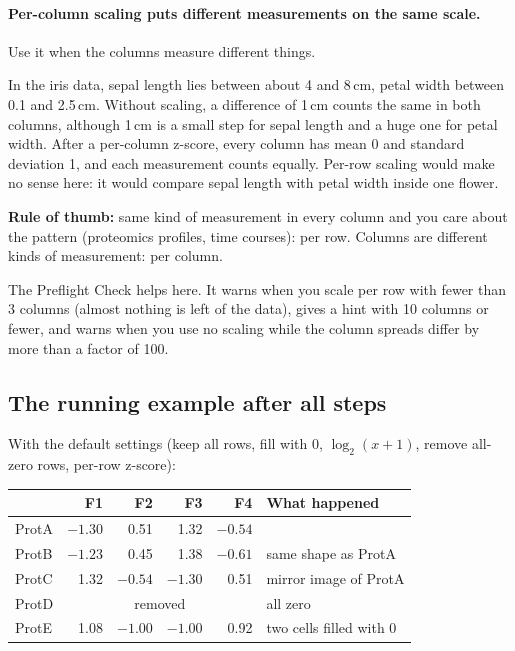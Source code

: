 \documentclass[11pt,a4paper]{article}
\begin{document}
\paragraph{Per-column scaling puts different measurements on the same scale.}
Use it when the columns measure different things.

\begin{example}
In the iris data, sepal length lies between about 4 and 8\,cm, petal width between 0.1 and 2.5\,cm. Without scaling,
a difference of 1\,cm counts the same in both columns, although 1\,cm is a small step for sepal length and a huge
one for petal width. After a per-column z-score, every column has mean 0 and standard deviation 1, and each
measurement counts equally. Per-row scaling would make no sense here: it would compare sepal length with petal
width inside one flower.
\end{example}

\textbf{Rule of thumb:} same kind of measurement in every column and you care about the pattern (proteomics
profiles, time courses): per row. Columns are different kinds of measurement: per column.

The Preflight Check helps here. It warns when you scale per row with fewer than 3 columns (almost nothing is left of
the data), gives a hint with 10 columns or fewer, and warns when you use no scaling while the column spreads differ
by more than a factor of 100.

\subsection{The running example after all steps}

With the default settings (keep all rows, fill with 0, $\log_2(x+1)$, remove all-zero rows, per-row z-score):

\begin{center}
\begin{tabular}{l rrrr l}
\toprule
& F1 & F2 & F3 & F4 & What happened\\
\midrule
ProtA & $-1.30$ & 0.51 & 1.32 & $-0.54$ & \\
ProtB & $-1.23$ & 0.45 & 1.38 & $-0.61$ & same shape as ProtA\\
ProtC & 1.32 & $-0.54$ & $-1.30$ & 0.51 & mirror image of ProtA\\
ProtD & \multicolumn{4}{c}{removed} & all zero\\
ProtE & 1.08 & $-1.00$ & $-1.00$ & 0.92 & two cells filled with 0\\
\bottomrule
\end{tabular}
\end{center}
\end{document}
